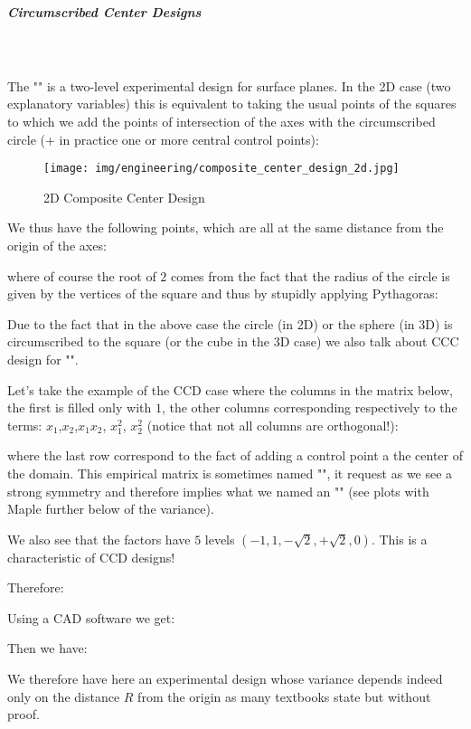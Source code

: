 	\subparagraph{Circumscribed Center Designs}\mbox{}\\\\
	The "" is a two-level experimental design for surface planes. In the 2D case (two explanatory variables) this is equivalent to taking the usual points of the squares to which we add the points of intersection of the axes with the circumscribed circle (+ in practice one or more central control points):	
	\begin{figure}[H]
		\centering
		\texttt{[image: img/engineering/composite\_center\_design\_2d.jpg]}	
		\caption{2D Composite Center Design}
	\end{figure}
	We thus have the following points, which are all at the same distance from the origin of the axes:
	
	where of course the root of $2$ comes from the fact that the radius of the circle is given by the vertices of the square and thus by stupidly applying Pythagoras:
	
 	Due to the fact that in the above case the circle (in 2D) or the sphere (in 3D) is circumscribed to the square (or the cube in the 3D case) we also talk about CCC design for "".

	Let's take the example of the CCD case where the columns in the matrix below, the first is filled only with $1$, the other columns corresponding respectively to the terms: $x_1$,$x_2$,$x_1x_2$, $x_1^2$, $x_2^2$ (notice that not all columns are orthogonal!):
	
	where the last row correspond to the fact of adding a control point a the center of the domain. This empirical matrix is sometimes named "", it request as we see a strong symmetry and therefore implies what we named an "" (see plots with Maple further below of the variance).
	
	We also see that the factors have $5$ levels $(-1,1,-\sqrt{2},+\sqrt{2},0)$. This is a characteristic of CCD designs!
	
	Therefore:
	
	Using a CAD software we get:
	
	Then we have:
	
	We therefore have here an experimental design whose variance depends indeed only on the distance $R$ from the origin as many textbooks state but without proof.

